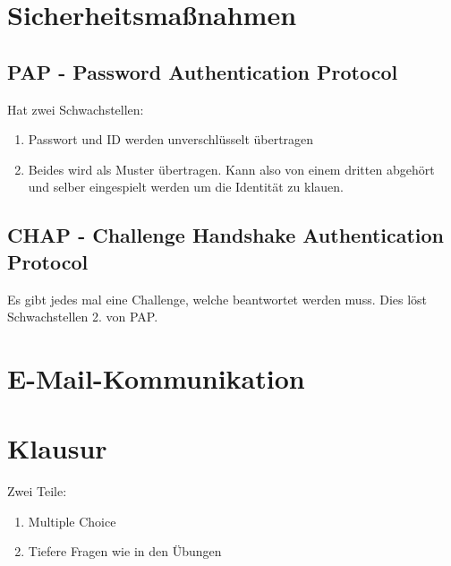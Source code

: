 \documentclass[a4paper]{article}
\title{\docTitle}
\author{Moritz}
\date{\today}
\begin{document}
\maketitle
\tableofcontents


\section{Sicherheitsmaßnahmen}

\subsection{PAP - Password Authentication Protocol}

Hat zwei Schwachstellen:

\begin{enumerate}
    \item Passwort und ID werden unverschlüsselt übertragen
    \item Beides wird als Muster übertragen. Kann also von einem dritten abgehört und selber eingespielt werden um die Identität zu klauen.
\end{enumerate}

\subsection{CHAP - Challenge Handshake Authentication Protocol}

Es gibt jedes mal eine Challenge, welche beantwortet werden muss. Dies löst Schwachstellen 2. von PAP.



\section{E-Mail-Kommunikation}

\section{Klausur}

Zwei Teile:

\begin{enumerate}
    \item Multiple Choice
    \item Tiefere Fragen wie in den Übungen
\end{enumerate}
\end{document}
